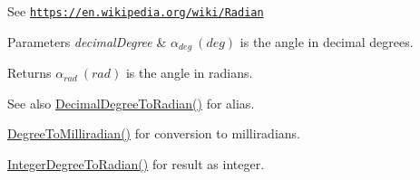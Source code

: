 See \href{https://en.wikipedia.org/wiki/Radian}{\tt https\+://en.\+wikipedia.\+org/wiki/\+Radian} 
\begin{DoxyParams}{Parameters}
{\em decimal\+Degree} & $\alpha_{deg}\ (deg)$ is the angle in decimal degrees. \\
\hline
\end{DoxyParams}
\begin{DoxyReturn}{Returns}
$\alpha_{rad}\ (rad)$ is the angle in radians. 
\end{DoxyReturn}
\begin{DoxySeeAlso}{See also}
\mbox{\hyperlink{group___e_g_x_math-_angle_conversions-_decimal_degree_ga906ee2c83cdf4caa59eb613dc2d5d52a}{Decimal\+Degree\+To\+Radian()}} for alias. 

\mbox{\hyperlink{group___e_g_x_math-_angle_conversions-_degree_gae4fa6c2d3805430760783650cfbfdb11}{Degree\+To\+Milliradian()}} for conversion to milliradians. 

\mbox{\hyperlink{group___e_g_x_math-_angle_conversions-_integer_degree_ga05d3368b00ea27b9895de2ffe5c8df38}{Integer\+Degree\+To\+Radian()}} for result as integer. 
\end{DoxySeeAlso}

